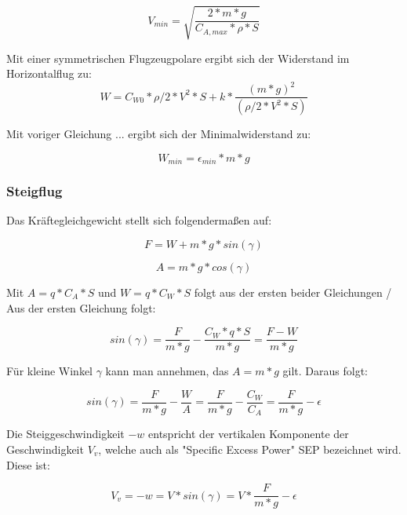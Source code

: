 \begin{equation}
V_{min} = \sqrt{\frac{2 * m * g}{C_{A,max} * \rho * S}}
\end{equation}

Mit einer symmetrischen Flugzeugpolare ergibt sich der Widerstand im Horizontalflug zu:
\begin{equation}
W = C_{W0} * \rho/2 * V^2 * S + k * \frac{(m*g)^2}{(\rho/2 * V^2 * S)}
\end{equation}

Mit voriger Gleichung ... ergibt sich der Minimalwiderstand zu:

\begin{equation}
W_{min} = \epsilon_{min} * m * g
\end{equation}

\subsubsection{Steigflug}
\label{steigflug}

Das Kräftegleichgewicht stellt sich folgendermaßen auf:

\begin{equation}
F = W + m * g * sin(\gamma)
\end{equation}

\begin{equation}
A = m * g * cos(\gamma)
\end{equation}

Mit $A = q * C_A * S$ und $W = q * C_W * S$ folgt aus der ersten beider Gleichungen / Aus der ersten Gleichung folgt:

\begin{equation}
sin(\gamma) = \frac{F}{m * g} - \frac{C_W * q * S}{m * g} = \frac{F - W}{m * g}
\end{equation}

Für kleine Winkel $\gamma$ kann man annehmen, das $A = m * g$ gilt. Daraus folgt:

\begin{equation}
sin(\gamma) = \frac{F}{m * g} - \frac{W}{A} = \frac{F}{m * g} - \frac{C_W}{C_A} = \frac{F}{m * g} - \epsilon
\end{equation}

Die Steiggeschwindigkeit $-w$ entspricht der vertikalen Komponente der Geschwindigkeit $V_v$, welche auch als "Specific Excess Power" SEP bezeichnet wird. Diese ist:

\begin{equation}
V_v = -w = V * sin(\gamma) = V * \frac{F}{m * g} - \epsilon
\end{equation}

